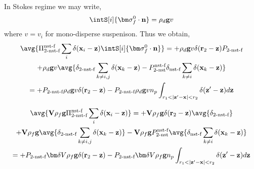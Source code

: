 In Stokes regime we may write, 
\begin{equation*}
    \intS[i] {\bm\sigma_f^0 \cdot \textbf{n}} =
    \rho_d \textbf{g} v
\end{equation*}
where $v=v_i$ for mono-disperse suspenison. 
Thus we obtain, 
\begin{multline}
    \avg{\Pi_\text{2-nst-f}^\text{nst-f} \sum_i \delta(\textbf{x}_i - \textbf{z}) \intS[i] {\bm\sigma_f^0 \cdot \textbf{n}}}
    =
    + \rho_d \textbf{g} v \delta(\textbf{r}_2 - \textbf{z}) P_\text{2-nst-f}\\
    + \rho_d \textbf{g} v \avg{\delta_\text{2-nst-f} \sum_{k\neq i,j} \delta(\textbf{x}_k - \textbf{z}) 
    -  P^\text{nst-f}_\text{2-nst} \delta_\text{nst-f} \sum_{k\neq i} \delta(\textbf{x}_k - \textbf{z}) }\\
    =
    + P_\text{2-nst-f} \rho_d \textbf{g} v \delta(\textbf{r}_2 - \textbf{z}) 
    - P_\text{2-nst-f} \rho_d \textbf{g} v n_p \int_{r_1<|\textbf{z}' - \textbf{x}| <r_2} \delta(\textbf{z}'-\textbf{z})d\textbf{z}\\
\end{multline}

\begin{multline}
    \avg{\textbf{V}\rho_f \textbf{g}\Pi_\text{2-nst-f}^\text{nst-f} \sum_i \delta(\textbf{x}_i - \textbf{z}) }
    =
    +\textbf{V}\rho_f \textbf{g}\delta(\textbf{r}_2 - \textbf{z}) \avg{\delta_\text{2-nst-f}}\\
    +\textbf{V}\rho_f \textbf{g} \avg{\delta_\text{2-nst-f} \sum_{k\neq i,j} \delta(\textbf{x}_k - \textbf{z}) }
    -\textbf{V}\rho_f \textbf{g} P^\text{nst-f}_\text{2-nst} \avg{ \delta_\text{nst-f} \sum_{k\neq i} \delta(\textbf{x}_k - \textbf{z}) }\\
    =
    + P_\text{2-nst-f} \bm\delta V \rho_f \textbf{g}\delta(\textbf{r}_2 - \textbf{z}) 
    - P_\text{2-nst-f} \bm\delta V \rho_f \textbf{g} n_p \int_{r_1<|\textbf{z}' - \textbf{x}| <r_2} \delta(\textbf{z}'-\textbf{z})d\textbf{z}
\end{multline}


